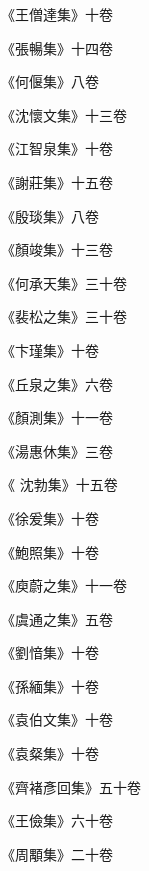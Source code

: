 \begin{pinyinscope}
 《王僧達集》十卷



 《張暢集》十四卷



 《何偃集》八卷



 《沈懷文集》十三卷



 《江智泉集》十卷



 《謝莊集》十五卷



 《殷琰集》八卷



 《顏竣集》十三卷



 《何承天集》三十卷



 《裴松之集》三十卷



 《卞瑾集》十卷



 《丘泉之集》六卷



 《顏測集》十一卷



 《湯惠休集》三卷



 《
 沈勃集》十五卷



 《徐爰集》十卷



 《鮑照集》十卷



 《庾蔚之集》十一卷



 《虞通之集》五卷



 《劉愔集》十卷



 《孫緬集》十卷



 《袁伯文集》十卷



 《袁粲集》十卷



 《齊褚彥回集》五十卷



 《王儉集》六十卷



 《周顒集》二十卷




\end{pinyinscope}
